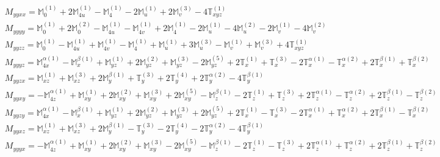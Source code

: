 \documentclass[fleqn,8pt,landscape]{jsarticle}
\begin{document}
\begin{align*}
& M_{yyxx} = \mathbb{M}_{0}^{(1)} + 2 \mathbb{M}_{4u}^{(1)} - \mathbb{M}_{4}^{(1)} - 2 \mathbb{M}_{u}^{(1)} + 2 \mathbb{M}_{v}^{(3)} - 4 \mathbb{T}_{xyz}^{(1)} \\
& M_{yyyy} = \mathbb{M}_{0}^{(1)} + 2 \mathbb{M}_{0}^{(2)} - \mathbb{M}_{4u}^{(1)} - \mathbb{M}_{4v}^{(1)} + 2 \mathbb{M}_{4}^{(1)} - 2 \mathbb{M}_{u}^{(1)} - 4 \mathbb{M}_{u}^{(2)} - 2 \mathbb{M}_{v}^{(1)} - 4 \mathbb{M}_{v}^{(2)} \\
& M_{yyzz} = \mathbb{M}_{0}^{(1)} - \mathbb{M}_{4u}^{(1)} + \mathbb{M}_{4v}^{(1)} - \mathbb{M}_{4}^{(1)} + \mathbb{M}_{u}^{(1)} + 3 \mathbb{M}_{u}^{(3)} - \mathbb{M}_{v}^{(1)} + \mathbb{M}_{v}^{(3)} + 4 \mathbb{T}_{xyz}^{(1)} \\
& M_{yyyz} = \mathbb{M}_{4x}^{\alpha(1)} - \mathbb{M}_{x}^{\beta(1)} + \mathbb{M}_{yz}^{(1)} + 2 \mathbb{M}_{yz}^{(2)} + \mathbb{M}_{yz}^{(3)} - 2 \mathbb{M}_{yz}^{(5)} + 2 \mathbb{T}_{x}^{(1)} + \mathbb{T}_{x}^{(3)} - 2 \mathbb{T}_{x}^{\alpha(1)} - \mathbb{T}_{x}^{\alpha(2)} + 2 \mathbb{T}_{x}^{\beta(1)} + \mathbb{T}_{x}^{\beta(2)} \\
& M_{yyzx} = \mathbb{M}_{xz}^{(1)} + \mathbb{M}_{xz}^{(3)} + 2 \mathbb{M}_{y}^{\beta(1)} + \mathbb{T}_{y}^{(3)} + 2 \mathbb{T}_{y}^{(4)} + 2 \mathbb{T}_{y}^{\alpha(2)} - 4 \mathbb{T}_{y}^{\beta(1)} \\
& M_{yyxy} = - \mathbb{M}_{4z}^{\alpha(1)} + \mathbb{M}_{xy}^{(1)} + 2 \mathbb{M}_{xy}^{(2)} + \mathbb{M}_{xy}^{(3)} + 2 \mathbb{M}_{xy}^{(5)} - \mathbb{M}_{z}^{\beta(1)} - 2 \mathbb{T}_{z}^{(1)} + \mathbb{T}_{z}^{(3)} + 2 \mathbb{T}_{z}^{\alpha(1)} - \mathbb{T}_{z}^{\alpha(2)} + 2 \mathbb{T}_{z}^{\beta(1)} - \mathbb{T}_{z}^{\beta(2)} \\
& M_{yyzy} = \mathbb{M}_{4x}^{\alpha(1)} - \mathbb{M}_{x}^{\beta(1)} + \mathbb{M}_{yz}^{(1)} + 2 \mathbb{M}_{yz}^{(2)} + \mathbb{M}_{yz}^{(3)} + 2 \mathbb{M}_{yz}^{(5)} + 2 \mathbb{T}_{x}^{(1)} - \mathbb{T}_{x}^{(3)} - 2 \mathbb{T}_{x}^{\alpha(1)} + \mathbb{T}_{x}^{\alpha(2)} + 2 \mathbb{T}_{x}^{\beta(1)} - \mathbb{T}_{x}^{\beta(2)} \\
& M_{yyxz} = \mathbb{M}_{xz}^{(1)} + \mathbb{M}_{xz}^{(3)} + 2 \mathbb{M}_{y}^{\beta(1)} - \mathbb{T}_{y}^{(3)} - 2 \mathbb{T}_{y}^{(4)} - 2 \mathbb{T}_{y}^{\alpha(2)} - 4 \mathbb{T}_{y}^{\beta(1)} \\
& M_{yyyx} = - \mathbb{M}_{4z}^{\alpha(1)} + \mathbb{M}_{xy}^{(1)} + 2 \mathbb{M}_{xy}^{(2)} + \mathbb{M}_{xy}^{(3)} - 2 \mathbb{M}_{xy}^{(5)} - \mathbb{M}_{z}^{\beta(1)} - 2 \mathbb{T}_{z}^{(1)} - \mathbb{T}_{z}^{(3)} + 2 \mathbb{T}_{z}^{\alpha(1)} + \mathbb{T}_{z}^{\alpha(2)} + 2 \mathbb{T}_{z}^{\beta(1)} + \mathbb{T}_{z}^{\beta(2)} \\

\end{align*}
\end{document}
